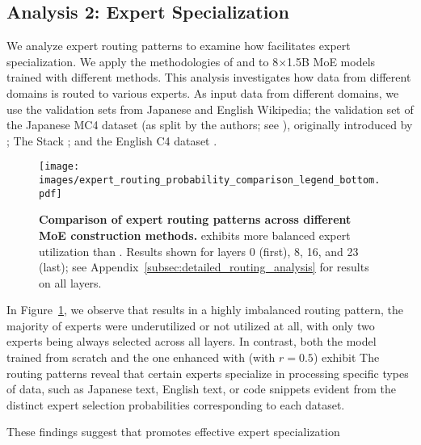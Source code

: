 \subsection{Analysis 2: Expert Specialization}
\label{sec:exp:diversity}


We analyze expert routing patterns to examine how \methodname{} facilitates expert specialization. We apply the methodologies of \citet{jiang2024mixtralexperts} and \citet{muennighoff2024olmoeopenmixtureofexpertslanguage} to 8×1.5B MoE models trained with different methods. This analysis investigates how data from different domains is routed to various experts. As input data from different domains, we use the validation sets from Japanese and English Wikipedia; the validation set of the Japanese MC4 dataset (as split by the authors; see \citealt{llmjp2024llmjpcrossorganizationalprojectresearch}), originally introduced by \citet{2019t5}; The Stack \citep{kocetkov2023the}; and the English C4 dataset \citep{muennighoff2024olmoeopenmixtureofexpertslanguage}.



\begin{figure}[t] \centering \texttt{[image: images/expert\_routing\_probability\_comparison\_legend\_bottom.pdf]} \vskip -3pt 
\caption{
\textbf{Comparison of expert routing patterns across different MoE construction methods.} 
\methodname{} exhibits more balanced expert utilization than \NUname{}.
Results shown for layers 0 (first), 8, 16, and 23 (last); see Appendix~\ref{subsec:detailed_routing_analysis} for results on all layers.
} \label{fig:routing} \end{figure}

 


In Figure~\ref{fig:routing}, we observe that \NUname{}  results in a highly imbalanced routing pattern,  the majority of experts were underutilized or not utilized at all, with only two experts being always selected across all layers.  In contrast, both the model trained from scratch and the one enhanced with \methodname{} (with $r=0.5$) exhibit  The routing patterns reveal that certain experts specialize in processing specific types of data, such as Japanese text, English text, or code snippets evident from the distinct expert selection probabilities corresponding to each dataset.

These findings suggest that \methodname{} promotes effective expert specialization 
